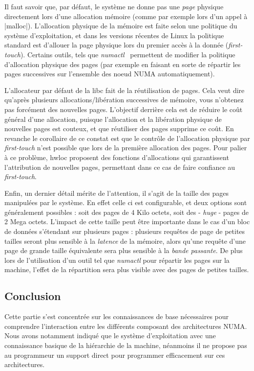 Il faut savoir que, par défaut, le système ne donne pas une \emph{page} physique directement lors d'une allocation mémoire (comme par exemple lors d'un appel à |malloc|).
L'allocation physique de la mémoire est faite selon une politique du système d'exploitation, et dans les versions récentes de Linux la politique standard est d'allouer la page physique lors du premier accès à la donnée (\emph{first-touch}).
Certains outils, tels que \emph{numactl}~\cite{numactl} permettent de modifier la politique d'allocation physique des pages (par exemple en faisant en sorte de répartir les pages successives sur l'ensemble des noeud NUMA automatiquement).

L'allocateur par défaut de la libc fait de la réutilisation de pages. Cela veut dire qu'après plusieurs allocations/libération successives de mémoire, vous n'obtenez pas forcément des nouvelles pages.
L'objectif derrière cela est de réduire le coût général d'une allocation, puisque l'allocation et la libération physique de nouvelles pages est couteux, et que réutiliser des pages supprime ce coût.
En revanche le corollaire de ce constat est que le contrôle de l'allocation physique par \emph{first-touch} n'est possible que lors de la première allocation des pages.
Pour palier à ce problème, hwloc proposent des fonctions d'allocations qui garantissent l'attribution de nouvelles pages, permettant dans ce cas de faire confiance au \emph{first-touch}.

Enfin, un dernier détail mérite de l'attention, il s'agit de la taille des pages manipulées par le système.
En effet celle ci est configurable, et deux options sont généralement possibles : soit des pages de 4 Kilo octets, soit des - \emph{huge} - pages de 2 Mega octets.
L'impact de cette taille peut être importante dans le cas d'un bloc de données s'étendant sur plusieurs pages : plusieurs requêtes de page de petites tailles seront plus sensible à la \emph{latence} de la mémoire, alors qu'une requête d'une page de grande taille équivalente sera plus sensible à la \emph{bande passante}.
De plus lors de l'utilisation d'un outil tel que \emph{numactl} pour répartir les pages sur la machine, l'effet de la répartition sera plus visible avec des pages de petites tailles.


\subsection*{Conclusion}

Cette partie s'est concentrée sur les connaissances de base nécessaires pour comprendre l'interaction entre les différents composant des architectures NUMA.
Nous avons notamment indiqué que le système d'exploitation avec une connaissance basique de la hiérarchie de la machine, néanmoins il ne propose pas au programmeur un support direct pour programmer efficacement sur ces architectures.


